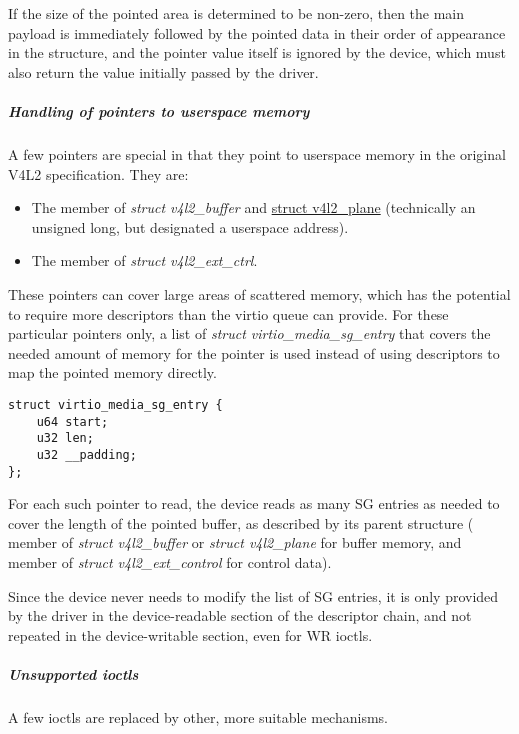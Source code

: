 If the size of the pointed area is determined to be non-zero, then the main
payload is immediately followed by the pointed data in their order of
appearance in the structure, and the pointer value itself is ignored by the
device, which must also return the value initially passed by the driver.

\subparagraph{Handling of pointers to userspace memory}
\label{sec:Device Types / Media Device / V4L2 ioctls / Userspace memory}

A few pointers are special in that they point to userspace memory in the
original V4L2 specification. They are:

\begin{itemize}
\item The  member of \textit{struct v4l2_buffer} and
\href{https://www.kernel.org/doc/html/latest/userspace-api/media/v4l/buffer.html#struct-v4l2-plane}{struct v4l2_plane}
(technically an unsigned long, but designated a userspace address).
\item The  member of \textit{struct v4l2_ext_ctrl}.
\end{itemize}

These pointers can cover large areas of scattered memory, which has the
potential to require more descriptors than the virtio queue can provide. For
these particular pointers only, a list of \textit{struct virtio_media_sg_entry}
that covers the needed amount of memory for the pointer is used instead of
using descriptors to map the pointed memory directly.

\begin{lstlisting}
struct virtio_media_sg_entry {
	u64 start;
	u32 len;
	u32 __padding;
};
\end{lstlisting}

For each such pointer to read, the device reads as many SG entries as needed
to cover the length of the pointed buffer, as described by its parent
structure ( member of \textit{struct v4l2_buffer} or
\textit{struct v4l2_plane} for buffer memory, and  member of
\textit{struct v4l2_ext_control} for control data).

Since the device never needs to modify the list of SG entries, it is only
provided by the driver in the device-readable section of the descriptor chain,
and not repeated in the device-writable section, even for WR ioctls.

\subparagraph{Unsupported ioctls}

A few ioctls are replaced by other, more suitable mechanisms.

